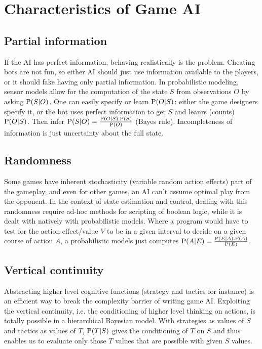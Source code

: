 \section{Characteristics of Game AI}

\subsection{Partial information}
If the AI has perfect information, behaving realistically is the problem. Cheating bots are not fun, so either AI should just use information available to the players, or it should fake having only partial information. In probabilistic modeling, sensor models allow for the computation of the state $S$ from observations $O$ by asking $\mathrm{P}(S|O)$. One can easily specify or learn $\mathrm{P}(O|S)$: either the game designers specify it, or the bot uses perfect information to get $S$ and leanrs (counts) $\mathrm{P}(O|S)$. Then infer $\mathrm{P}(S|O) = \frac{\mathrm{P}(O|S).\mathrm{P}(S)}{\mathrm{P}(O)}$ (Bayes rule). Incompleteness of information is just uncertainty about the full state.

\subsection{Randomness}
Some games have inherent stochasticity (variable random action effects) part of the gameplay, and even for other games, an AI can't assume optimal play from the opponent. In the context of state estimation and control, dealing with this randomness require ad-hoc methods for scripting of boolean logic, while it is dealt with natively with probabilistic models. Where a program would have to test for the action effect/value $V$ to be in a given interval to decide on a given course of action $A$, a probabilistic models just computes $\mathrm{P}(A|E) = \frac{\mathrm{P}(E|A).\mathrm{P}(A)}{\mathrm{P}(E)}$.

\subsection{Vertical continuity}
Abstracting higher level cognitive functions (strategy and tactics for instance) is an efficient way to break the complexity barrier of writing game AI. Exploiting the vertical continuity, i.e. the conditioning of higher level thinking on actions, is totally possible in a hierarchical Bayesian model. With strategies as values of $S$ and tactics as values of $T$, $\mathrm{P}(T|S)$ gives the conditioning of $T$ on $S$ and thus enables us to evaluate only those $T$ values that are possible with given $S$ values.

